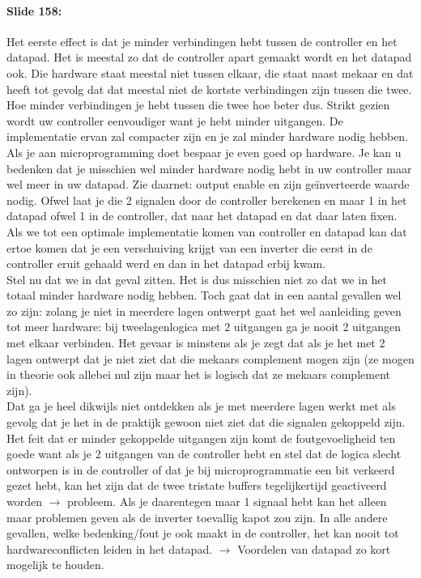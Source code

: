 \documentclass[10pt,a4paper]{book}
\begin{document}
\paragraph{Slide 158:} Het eerste effect is dat je minder verbindingen hebt tussen de controller en het datapad. Het is meestal zo dat de controller apart gemaakt wordt en het datapad ook. Die hardware staat meestal niet tussen elkaar, die staat naast mekaar en dat heeft tot gevolg dat dat meestal niet de kortste verbindingen zijn tussen die twee. Hoe minder verbindingen je hebt tussen die twee hoe beter dus. Strikt gezien wordt uw controller eenvoudiger want je hebt minder uitgangen. De implementatie ervan zal compacter zijn en je zal minder hardware nodig hebben. 
 Als je aan microprogramming doet bespaar je even goed op hardware. Je kan u bedenken dat je misschien wel minder hardware nodig hebt in uw controller maar wel meer in uw datapad. Zie daarnet: output enable en zijn ge\"inverteerde waarde nodig. Ofwel laat je die 2 signalen door de controller berekenen en maar 1 in het datapad ofwel 1 in de controller, dat naar het datapad en dat daar laten fixen.\\
Als we tot een optimale implementatie komen van controller en datapad kan dat ertoe komen dat je een verschuiving krijgt van een inverter die eerst in de controller eruit gehaald werd en dan in het datapad erbij kwam.\\
Stel nu dat we in dat geval zitten. Het is dus misschien niet zo dat we in het totaal minder hardware nodig hebben. Toch gaat dat in een aantal gevallen wel zo zijn: zolang je niet in meerdere lagen ontwerpt gaat het wel aanleiding geven tot meer hardware: bij tweelagenlogica met 2 uitgangen ga je nooit 2 uitgangen met elkaar verbinden. Het gevaar is minstens als je zegt dat als je het met 2 lagen ontwerpt dat je niet ziet dat die mekaars complement mogen zijn (ze mogen in theorie ook allebei nul zijn maar het is logisch dat ze mekaars complement zijn).\\
Dat ga je heel dikwijls niet ontdekken als je met meerdere lagen werkt met als gevolg dat je het in de praktijk gewoon niet ziet dat die signalen gekoppeld zijn.\\
Het feit dat er minder gekoppelde uitgangen zijn komt de foutgevoeligheid ten goede want als je 2 uitgangen van de controller hebt en stel dat de logica slecht ontworpen is in de controller of dat je bij microprogrammatie een bit verkeerd gezet hebt, kan het zijn dat de twee tristate buffers tegelijkertijd geactiveerd worden $\rightarrow$ probleem. Als je daarentegen maar 1 signaal hebt kan het alleen maar problemen geven als de inverter toevallig kapot zou zijn. In alle andere gevallen, welke bedenking/fout je ook maakt in de controller, het kan nooit tot hardwareconflicten leiden in het datapad. $\rightarrow$ Voordelen van datapad zo kort mogelijk te houden.\\
\end{document}
